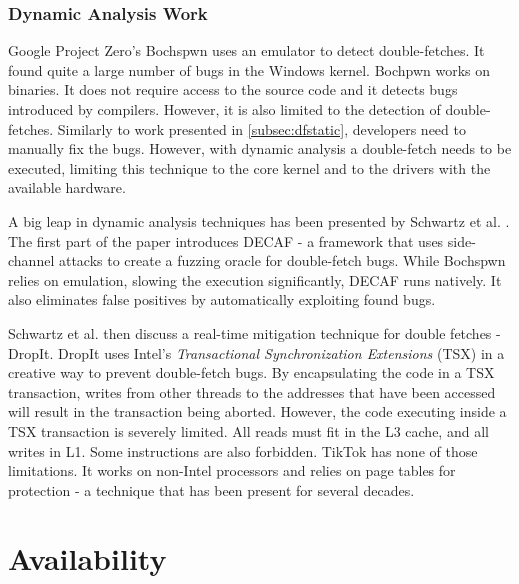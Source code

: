 \subsubsection{Dynamic Analysis Work}
Google Project Zero's Bochspwn \cite{jurczyk2013bochspwn} uses an emulator to
detect double-fetches. It found quite a large number of bugs in the Windows
kernel. Bochpwn works on binaries. It does not require access to the source code
and it detects bugs introduced by compilers. However, it is also limited to the
detection of double-fetches. Similarly to work presented in 
\cref{subsec:dfstatic}, developers need to manually fix the bugs. However, with
dynamic analysis a double-fetch needs to be executed, limiting this
technique to the core kernel and to the drivers with the available hardware.

A big leap in dynamic analysis techniques has been presented by Schwartz et al.
\cite{schwarz2018automated}. The first part of the paper introduces DECAF - a
framework that uses side-channel attacks to create a fuzzing oracle for
double-fetch bugs. While Bochspwn relies on emulation, slowing the execution
significantly, DECAF runs natively. It also eliminates false positives by
automatically exploiting found bugs.

Schwartz et al. then discuss a real-time mitigation technique for double
fetches - DropIt. DropIt uses Intel's \emph{Transactional Synchronization 
Extensions} (TSX)\cite{intel64and} in a creative way to prevent double-fetch
bugs. By encapsulating the code in a TSX transaction, writes from other threads
to the addresses that have been accessed will result in the
transaction being aborted. However, the code executing inside a TSX transaction
is severely limited. All reads must fit in the L3 cache, and all writes in L1.
Some instructions are also forbidden. TikTok has none of those limitations.
It works on non-Intel processors and relies on page tables for protection - a
technique that has been present for several decades.



\section*{Availability}

